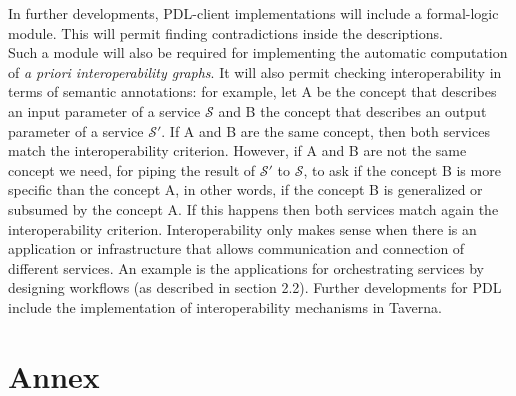 \documentclass[a4paper,11pt] {ivoa}
\begin{document}
\noindent In further developments, PDL-client implementations will include a formal-logic module. This will permit finding contradictions inside the descriptions.\\
Such a  module will also be required for implementing the automatic computation of {\it a priori interoperability graphs}. 
It will also permit checking interoperability in terms of semantic annotations: for example, let A be the concept that describes an input parameter of a service $\mathcal S$ and B the concept that describes an output parameter of a service $\mathcal S'$. If A and B are the same concept, then both services match the interoperability criterion. However, if A and B are not the same concept we need, for piping the result of  
$\mathcal S'$ to $\mathcal S$, to ask if the concept B is more specific than the concept A, in other words, if the concept B is generalized or subsumed by the concept A. If this happens then both services match again the interoperability criterion. 
Interoperability only makes sense when there is an application or infrastructure that allows communication and connection of different services. An example is the applications for orchestrating services by designing workflows (as described in section 2.2). Further developments for PDL include the implementation of interoperability mechanisms in Taverna.


\section{Annex}
\end{document}
